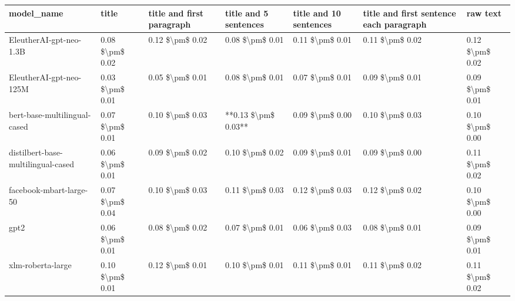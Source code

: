 \begin{tabular}{lllllll}
\toprule
                        model\_name &           title & title and first paragraph & title and 5 sentences & title and 10 sentences & title and first sentence each paragraph &        raw text \\
\midrule
           EleutherAI-gpt-neo-1.3B & 0.08 \$\textbackslash pm\$ 0.02 &           0.12 \$\textbackslash pm\$ 0.02 &       0.08 \$\textbackslash pm\$ 0.01 &        0.11 \$\textbackslash pm\$ 0.01 &                         0.11 \$\textbackslash pm\$ 0.02 & 0.12 \$\textbackslash pm\$ 0.02 \\
           EleutherAI-gpt-neo-125M & 0.03 \$\textbackslash pm\$ 0.01 &           0.05 \$\textbackslash pm\$ 0.01 &       0.08 \$\textbackslash pm\$ 0.01 &        0.07 \$\textbackslash pm\$ 0.01 &                         0.09 \$\textbackslash pm\$ 0.01 & 0.09 \$\textbackslash pm\$ 0.01 \\
      bert-base-multilingual-cased & 0.07 \$\textbackslash pm\$ 0.01 &           0.10 \$\textbackslash pm\$ 0.03 &   **0.13 \$\textbackslash pm\$ 0.03** &        0.09 \$\textbackslash pm\$ 0.00 &                         0.10 \$\textbackslash pm\$ 0.03 & 0.10 \$\textbackslash pm\$ 0.00 \\
distilbert-base-multilingual-cased & 0.06 \$\textbackslash pm\$ 0.01 &           0.09 \$\textbackslash pm\$ 0.02 &       0.10 \$\textbackslash pm\$ 0.02 &        0.09 \$\textbackslash pm\$ 0.01 &                         0.09 \$\textbackslash pm\$ 0.00 & 0.11 \$\textbackslash pm\$ 0.02 \\
           facebook-mbart-large-50 & 0.07 \$\textbackslash pm\$ 0.04 &           0.10 \$\textbackslash pm\$ 0.03 &       0.11 \$\textbackslash pm\$ 0.03 &        0.12 \$\textbackslash pm\$ 0.03 &                         0.12 \$\textbackslash pm\$ 0.02 & 0.10 \$\textbackslash pm\$ 0.00 \\
                              gpt2 & 0.06 \$\textbackslash pm\$ 0.01 &           0.08 \$\textbackslash pm\$ 0.02 &       0.07 \$\textbackslash pm\$ 0.01 &        0.06 \$\textbackslash pm\$ 0.03 &                         0.08 \$\textbackslash pm\$ 0.01 & 0.09 \$\textbackslash pm\$ 0.01 \\
                 xlm-roberta-large & 0.10 \$\textbackslash pm\$ 0.01 &           0.12 \$\textbackslash pm\$ 0.01 &       0.10 \$\textbackslash pm\$ 0.01 &        0.11 \$\textbackslash pm\$ 0.01 &                         0.11 \$\textbackslash pm\$ 0.02 & 0.11 \$\textbackslash pm\$ 0.02 \\
\bottomrule
\end{tabular}
